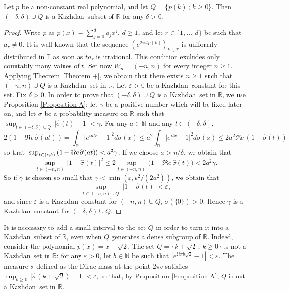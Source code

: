 \documentclass[11pt,english,a4paper]{smfart}
\numberwithin{equation}{section}
\theoremstyle{definition}
\begin{document}
\begin{example}\label{Example 8.5}
 Let $p$ be a non-constant real polynomial, and let ${Q}=\{p(k)\,;\,k\ge 0\}$. Then $(-\delta ,\delta )\cup {Q}$ is a {Kazhdan}\ subset of ${\ensuremath{\mathbb R}}$ for any $\delta >0$.
\end{example}
\begin{proof}
 Write $p$ as $p(x)=\sum_{j=0}^{d}a_{j}x^{j}$, $d\ge 1$, and let $r\in\{1,\dots,d\}$ be such that $a_{r}\neq 0$. It is well-known that the sequence $(e^{2i\pi tp(k)})_{k\in{\ensuremath{\mathbb Z}}}$ is uniformly distributed in ${\ensuremath{\mathbb T}}$ as soon as  $ta_{r}$ is irrational. This condition excludes only countably many values of $t$. Set now $W_{n}=(-n,n)$ for every integer ${n\ge 1}$. Applying Theorem \ref{Theorem +}, we obtain that there exists ${n\ge 1}$ such that $(-n,n)\cup{Q}$ is a {Kazhdan}\ set in ${\ensuremath{\mathbb R}}$. Let $\varepsilon >0$ be a {Kazhdan}\ constant for this set. Fix $\delta >0$. In order to prove that $(-\delta ,\delta )\cup{Q}$ is a {Kazhdan}\ set in ${\ensuremath{\mathbb R}}$, we use Proposition \ref{Proposition A}: let $\gamma $ be a positive number which will be fixed  later on, and let $\sigma $ be a probability measure on ${\ensuremath{\mathbb R}}$ such that $\sup_{t\in(-\delta ,\delta )\cup{Q}}\,\bigl|\widehat{\sigma }(t)-1\bigr|<\gamma $.
For any $a\in{\ensuremath{\mathbb N}}$ and any $t\in(-\delta ,\delta )$,
\[
 2(1-\Re e\,\widehat{\sigma }(at))=\int_{\ensuremath{\mathbb R}}\bigl|e^{iatx}-1\bigr|^{2}d\sigma (x)\le a^{2}\int_{\ensuremath{\mathbb R}}\bigl|e^{itx}-1\bigr|^{2}d\sigma (x)\le 2a^{2} \Re e\,(1-\widehat{\sigma }(t))
\]
so that ${\displaystyle}\sup_{t\in(\delta ,\delta )}\,(1-\Re e\,\widehat{\sigma }(at))<a^{2}\gamma $. If we choose $a>n/\delta $, we obtain that
\[
\sup_{t\in(-n,n)}\,\bigl|1-\widehat{\sigma }(t)\bigr|^{2}\le 2\sup_{t\in(-n,n)}\,\bigl(1-\Re e\,\widehat{\sigma }(t)\bigr)<2a^{2}\gamma .
\]
So if $\gamma $ is chosen so small that $\gamma <\min(\varepsilon ,\varepsilon ^{2}/(2a^{2}))$, we obtain that 
\[
\sup_{t\in(-n,n)\cup{Q}}\,\bigl|1-\widehat{\sigma }(t)\bigr|<\varepsilon,
\] 
and since $\varepsilon $ is a {Kazhdan}\ constant for $(-n,n)\cup{Q}$, $\sigma (\{0\})>0$. Hence $\gamma $ is a {Kazhdan}\ constant for $(-\delta ,\delta )\cup{Q}$.
\end{proof}

\begin{remark}\label{Remark 8.6}
 It is necessary to add a small interval to the set ${Q}$ in order to turn it into a {Kazhdan}\ subset of ${\ensuremath{\mathbb R}}$, even when ${Q}$ generates a dense subgroup of ${\ensuremath{\mathbb R}}$. Indeed, consider the polynomial $p(x)=x+\sqrt{2}$. The set ${Q}=\{k+\sqrt{2}\,;\,k\ge 0\}$ is not a {Kazhdan}\ set in ${\ensuremath{\mathbb R}}$: for any $\varepsilon >0$, let $b\in{\ensuremath{\mathbb N}}$ be such that $|e^{2i\pi b\sqrt{2}}-1|<\varepsilon $. The measure 
$\sigma$ defined as the Dirac mass at the point ${2\pi b}$ satisfies $\sup_{k\ge 0}\,|\widehat{\sigma }(k+\sqrt{2})-1|<\varepsilon $, so that, by Proposition \ref{Proposition A}, ${Q}$ is not a {Kazhdan}\ set in ${\ensuremath{\mathbb R}}$.\end{remark}
\end{document}
